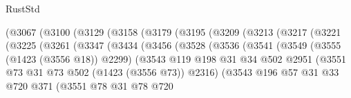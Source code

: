 \begin{lexlean}{RustStd}
\begin{coremodule}
{\begin{coremodule}
{{{{{{{{{                  (@3067
                    (@3100
                      (@3129
                        (@3158
                          (@3179
                            (@3195
                              (@3209
                                (@3213
                                  (@3217
                                    (@3221
                                      (@3225
                                        (@3261
                                          (@3347
                                            (@3434
                                              (@3456
                                                (@3528
                                                  (@3536
                                                    (@3541
                                                      (@3549
                                                        (@3555 (@1423 (@3556 @18)) @2299)
                                                        (@3543
                                                          @119
                                                          @198
                                                          @31
                                                          @34
                                                          @502
                                                          @2951
                                                          (@3551
                                                            @73
                                                            @31
                                                            @73
                                                            @502
                                                            (@1423 (@3556 @73))
                                                            @2316)
                                                          (@3543
                                                            @196
                                                            @57
                                                            @31
                                                            @33
                                                            @720
                                                            @371
                                                            (@3551
                                                              @78
                                                              @31
                                                              @78
                                                              @720
}}}}}}}}}
\end{coremodule}}
\end{coremodule}
\end{lexlean}
